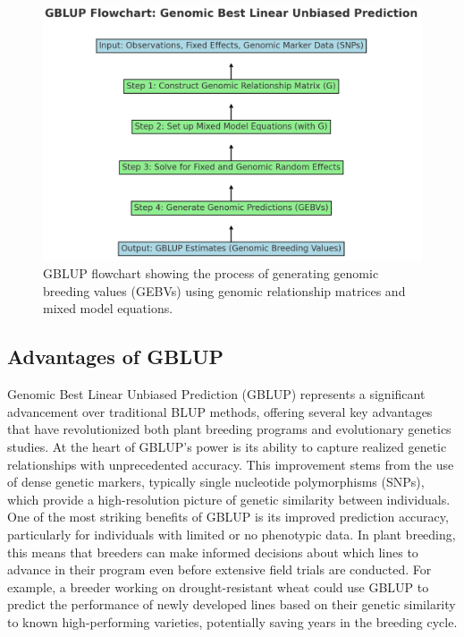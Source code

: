 \documentclass[12pt,a4paper]{article}
\begin{document}
\begin{figure}[h]
    \centering
    \includegraphics[width=1\textwidth]{gblupFC.jpg}
    \caption{GBLUP flowchart showing the process of generating genomic breeding values (GEBVs) using genomic relationship matrices and mixed model equations.}
    \label{fig:gblup-flowchart}
\end{figure}

\subsection{Advantages of GBLUP}

Genomic Best Linear Unbiased Prediction (GBLUP) represents a significant advancement over traditional BLUP methods, offering several key advantages that have revolutionized both plant breeding programs and evolutionary genetics studies. At the heart of GBLUP's power is its ability to capture realized genetic relationships with unprecedented accuracy. This improvement stems from the use of dense genetic markers, typically single nucleotide polymorphisms (SNPs), which provide a high-resolution picture of genetic similarity between individuals. One of the most striking benefits of GBLUP is its improved prediction accuracy, particularly for individuals with limited or no phenotypic data. In plant breeding, this means that breeders can make informed decisions about which lines to advance in their program even before extensive field trials are conducted. For example, a breeder working on drought-resistant wheat could use GBLUP to predict the performance of newly developed lines based on their genetic similarity to known high-performing varieties, potentially saving years in the breeding cycle.
\end{document}
